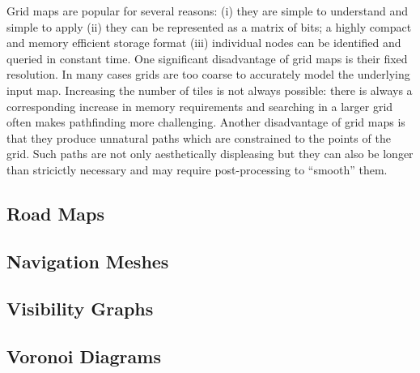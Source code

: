 Grid maps are popular for several reasons: (i) they are simple to understand 
and simple to apply (ii) they can be represented as a matrix of bits; a highly compact 
and memory efficient storage format (iii) individual nodes can be identified and
queried in constant time.
One significant disadvantage of grid maps is their fixed resolution. In many cases 
grids are too coarse to accurately model the underlying input map. Increasing the
number of tiles is not always possible: there is always a corresponding increase in
memory requirements and searching in a larger grid often makes pathfinding more 
challenging.
Another disadvantage of grid maps is that they produce unnatural paths which are
constrained to the points of the grid. Such paths are not only aesthetically 
displeasing but they can also be longer than stricictly necessary and may require
post-processing to ``smooth'' them.

\subsection{Road Maps}
\label{cha::lit::graphs::road}

\subsection{Navigation Meshes}
\label{cha::lit::graphs::nav}

\subsection{Visibility Graphs}
\label{cha::lit::graphs::vis}

\subsection{Voronoi Diagrams}
\label{cha::lit::graphs::voronoi}

